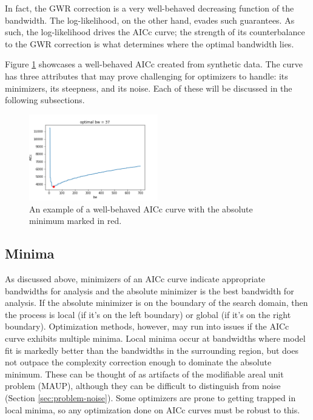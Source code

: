 \documentclass[letterpaper,12pt,twocolumn]{article}
\begin{document}
In fact, the GWR correction is a very well-behaved decreasing function of the bandwidth. The log-likelihood, on the other hand, evades such guarantees. As such, the log-likelihood drives the AICc curve; the strength of its counterbalance to the GWR correction is what determines where the optimal bandwidth lies.

Figure \ref{fig:sample-aicc} showcases a well-behaved AICc created from synthetic data. The curve has three attributes that may prove challenging for optimizers to handle: its minimizers, its steepness, and its noise. Each of these will be discussed in the following subsections.

\begin{figure}
    \centering
    \includegraphics[width=0.5\textwidth]{../figures/sample-aicc.png} 
    \caption{An example of a well-behaved AICc curve with the absolute minimum marked in red.}
    \label{fig:sample-aicc}
\end{figure}

\subsection{Minima}
As discussed above, minimizers of an AICc curve indicate appropriate bandwidths for analysis and the absolute minimizer is the best bandwidth for analysis. If the absolute minimizer is on the boundary of the search domain, then the process is local (if it's on the left boundary) or global (if it's on the right boundary). Optimization methods, however, may run into issues if the AICc curve exhibits multiple minima. Local minima occur at bandwidths where model fit is markedly better than the bandwidths in the surrounding region, but does not outpace the complexity correction enough to dominate the absolute minimum. These can be thought of as artifacts of the modifiable areal unit problem (MAUP), although they can be difficult to distinguish from noise (Section \ref{sec:problem-noise}). Some optimizers are prone to getting trapped in local minima, so any optimization done on AICc curves must be robust to this. 
\end{document}
